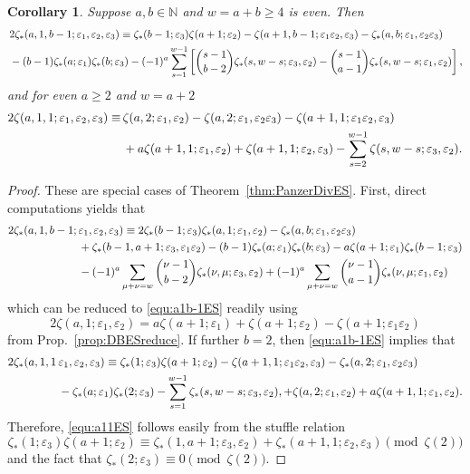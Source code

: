 \documentclass{article}
\newcommand\eps{{\varepsilon}}
\newcommand{\N}{\mathbb{N}}
\theoremstyle{plain}
\newtheorem{cor}[thm]{Corollary}
\theoremstyle{definition}
\begin{document}
\begin{cor}\label{cor:zeta(a,1,b-1);e1,e2,e3}
Suppose $a,b\in\N$ and $w=a+b\ge 4$ is even. Then
\begin{align}
&\,  2 \zeta_*(a,1,b-1;\eps_1,\eps_2,\eps_3) \equiv
 \zeta_*(b-1;\eps_3)\zeta(a+1; \eps_2)-\zeta(a+1,b-1; \eps_1\eps_2,\eps_3)-\zeta_*(a,b;\eps_1,\eps_2\eps_3) \notag\\
&\, -(b-1) \zeta_*(a;\eps_1) \zeta_*(b;\eps_3)
  -(-1)^{a}\sum_{s=1}^{w-1}\left[ \binom{s-1}{b-2} \zeta_*(s,w-s;\eps_3,\eps_2) -\binom{s-1}{a-1}\zeta_*(s,w-s;\eps_1,\eps_2)\right],  \label{equ:a1b-1ES}
\end{align}
and for even $a\ge 2$ and $w=a+2$
\begin{align}
  2 \zeta(a,1,1;\eps_1,\eps_2,\eps_3)
\equiv &\,\zeta(a,2;\eps_1,\eps_2)-\zeta(a,2;\eps_1,\eps_2\eps_3) -\zeta(a+1,1;\eps_1\eps_2,\eps_3) \notag \\
 &\,+a\zeta(a+1,1;\eps_1,\eps_2)+\zeta(a+1,1;\eps_2,\eps_3)  -\sum_{s=2}^{w-1}\zeta(s,w-s;\eps_3,\eps_2) . \label{equ:a11ES}
\end{align}
\end{cor}
\begin{proof}
These are special cases of Theorem~\ref{thm:PanzerDivES}. First, direct computations yields that
\begin{align*}
 2 \zeta_*(a,1,b-1;&\, \eps_1,\eps_2,\eps_3)
\equiv 2\zeta_*(b-1;\eps_3)\zeta_*(a,1;\eps_1,\eps_2)-\zeta_*(a,b;\eps_1,\eps_2\eps_3) \notag \\
&\, +\zeta_*(b-1,a+1;\eps_3,\eps_1\eps_2)-(b-1) \zeta_*(a;\eps_1) \zeta_*(b;\eps_3)-a\zeta(a+1;\eps_1) \zeta_*(b-1;\eps_3) \\
&\, -(-1)^{a}\sum_{\mu+\nu=w} \binom{\nu-1}{b-2} \zeta_
*(\nu,\mu;\eps_3,\eps_2)
+(-1)^a\sum_{\mu+\nu=w} \binom{\nu-1}{a-1} \zeta_
*(\nu,\mu;\eps_1,\eps_2)
\end{align*}
which can be reduced to \eqref{equ:a1b-1ES} readily using
\begin{equation*}
2\zeta(a,1;\eps_1,\eps_2)=a\zeta(a+1; \eps_1)+\zeta(a+1; \eps_2)-\zeta(a+1; \eps_1\eps_2)
\end{equation*}
from Prop.~\ref{prop:DBESreduce}. If further $b=2$, then  \eqref{equ:a1b-1ES} implies that
\begin{align*}
 2 \zeta_*(a,1,1&\, \eps_1,\eps_2,\eps_3)
\equiv \zeta_*(1;\eps_3)\zeta(a+1; \eps_2)-\zeta(a+1,1; \eps_1\eps_2,\eps_3)-\zeta_*(a,2;\eps_1,\eps_2\eps_3) \notag\\
&\, -\zeta_*(a;\eps_1) \zeta_*(2;\eps_3)
  -\sum_{s=1}^{w-1}\zeta_*(s,w-s;\eps_3,\eps_2) ,
+\zeta(a,2;\eps_1,\eps_2)+a\zeta(a+1,1;\eps_1,\eps_2).
\end{align*}
Therefore, \eqref{equ:a11ES} follows easily from the stuffle relation
\begin{equation*}
    \zeta_*(1;\eps_3)\zeta(a+1; \eps_2)\equiv \zeta_*(1,a+1;\eps_3, \eps_2)+ \zeta_*(a+1,1;\eps_2,\eps_3) \pmod{\zeta(2)}
\end{equation*}
and the fact that  $\zeta_*(2;\eps_3)\equiv 0\pmod{\zeta(2)}.$
\end{proof}
\end{document}
